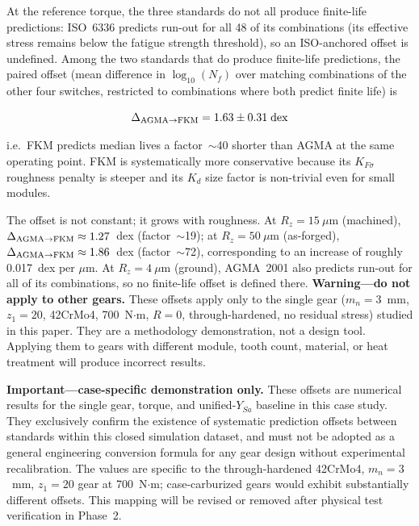 \documentclass[twocolumn,12pt,a4paper]{article}
\begin{document}
At the reference torque, the three standards do not all produce
finite-life predictions: ISO~6336 predicts run-out for all 48 of its
combinations (its effective stress remains below the fatigue strength
threshold), so an ISO-anchored offset is undefined. Among the two
standards that do produce finite-life predictions, the paired offset
(mean difference in $\log_{10}(N_f)$ over matching combinations of the
other four switches, restricted to combinations where both predict
finite life) is

\begin{equation}
\Delta_{\rm AGMA\to FKM} = 1.63 \pm 0.31\;\text{dex}
\label{eq:offsets}
\end{equation}

i.e.\ FKM predicts median lives a factor~$\sim$40 shorter than AGMA
at the same operating point. FKM is systematically more conservative
because its $K_{F\sigma}$ roughness penalty is steeper and its $K_d$
size factor is non-trivial even for small modules.

The offset is not constant; it grows with roughness. At
$R_z=15~\mu$m (machined), $\Delta_{\rm AGMA\to FKM} \approx
1.27$~dex (factor~$\sim$19); at $R_z=50~\mu$m (as-forged),
$\Delta_{\rm AGMA\to FKM} \approx 1.86$~dex (factor~$\sim$72),
corresponding to an increase of roughly 0.017~dex per $\mu$m. At
$R_z=4~\mu$m (ground), AGMA~2001 also predicts run-out for all of its
combinations, so no finite-life offset is defined there.
\textbf{Warning---do not apply to other gears.} These offsets apply
only to the single gear ($m_n=3$~mm, $z_1=20$, 42CrMo4,
700~N$\cdot$m, $R=0$, through-hardened, no residual stress) studied in
this paper. They are a methodology demonstration, not a design tool.
Applying them to gears with different module, tooth count, material,
or heat treatment will produce incorrect results.

\textbf{Important---case-specific demonstration only.}
These offsets are numerical results for the single gear, torque, and
unified-$Y_{Sa}$ baseline in this case study. They exclusively
confirm the existence of systematic prediction offsets between
standards within this closed simulation dataset, and must not be
adopted as a general engineering conversion formula for any gear
design without experimental recalibration. The values are specific to
the through-hardened 42CrMo4, $m_n=3$~mm, $z_1=20$ gear at
700~N$\cdot$m; case-carburized gears would exhibit substantially
different offsets. This mapping will be revised or removed after
physical test verification in Phase~2.
\end{document}
